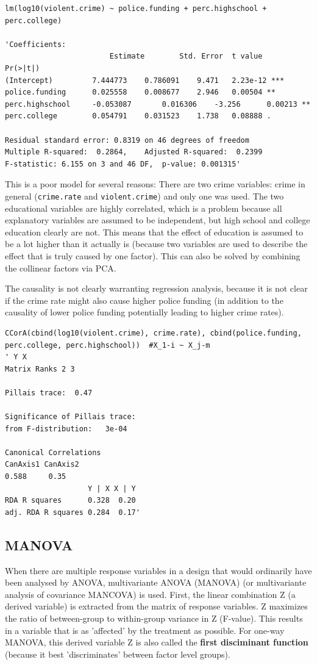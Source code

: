 \documentclass{article}
\begin{document}
\begin{lstlisting}
lm(log10(violent.crime) ~ police.funding + perc.highschool + perc.college)

'Coefficients:
                 		Estimate 		Std. Error 	t value 	Pr(>|t|)    
(Intercept)      	7.444773   	0.786091   	9.471 	2.23e-12 ***
police.funding   	0.025558   	0.008677   	2.946  	0.00504 ** 
perc.highschool 	-0.053087   	0.016306  	-3.256  	0.00213 ** 
perc.college     	0.054791   	0.031523   	1.738  	0.08888 .  

Residual standard error: 0.8319 on 46 degrees of freedom
Multiple R-squared:  0.2864,    Adjusted R-squared:  0.2399 
F-statistic: 6.155 on 3 and 46 DF,  p-value: 0.001315'
\end{lstlisting}
This is a poor model for several reasons: There are two crime variables: crime in general (\texttt{crime.rate} and \texttt{violent.crime}) and only one was used. The two educational variables are highly correlated, which is a problem because all explanatory variables are assumed to be independent, but high school and college education clearly are not. This means that the effect of education is assumed to be a lot higher than it actually is (because two variables are used to describe the effect that is truly caused by one factor). This can also be solved by combining the collinear factors via PCA.\par 
The causality is not clearly warranting regression analysis, because it is not clear if the crime rate might also cause higher police funding (in addition to the causality of lower police funding potentially leading to higher crime rates).

\begin{lstlisting}
CCorA(cbind(log10(violent.crime), crime.rate), cbind(police.funding, perc.college, perc.highschool))  #X_1-i ~ X_j-m
' Y X
Matrix Ranks 2 3

Pillais trace:  0.47 

Significance of Pillais trace:
from F-distribution:   3e-04 
                       
Canonical Correlations    
CanAxis1 CanAxis2
0.588     0.35
                   Y | X X | Y
RDA R squares      0.328  0.20
adj. RDA R squares 0.284  0.17'
\end{lstlisting}

\subsection{MANOVA}
When there are multiple response variables in a design that would ordinarily have been analysed by ANOVA, multivariante ANOVA (MANOVA) (or multivariante analysis of covariance MANCOVA) is used. First, the linear combination Z (a derived variable) is extracted from the matrix of response variables. Z maximizes the ratio of between-group to within-group variance in Z (F-value). This results in a variable that is as 'affected' by the treatment as possible. For one-way MANOVA, this derived variable Z is also called the \textbf{first disciminant function} (because it best 'discriminates' between factor level groups).
\end{document}
